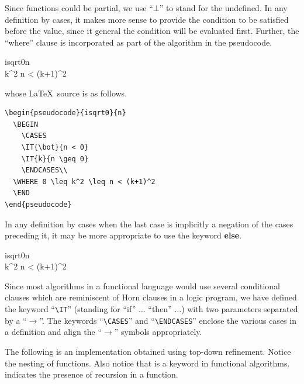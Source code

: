 \documentclass[a4]{article}
\begin{document}
Since functions could be partial, we use ``$\bot$'' to stand for the undefined.
In any definition by
cases, it makes more sense to provide the condition to be satisfied before the
value, since it general the condition will be evaluated first. Further, the
``where'' clause is incorporated as part of the algorithm in the pseudocode.

\begin{pseudocode}{isqrt0}{n}
  \BEGIN
    \CASES
    \ENDCASES\\
   \leq k^2 \leq n < (k+1)^2      
  \END
\end{pseudocode}

\noindent{}whose  \LaTeX\ source is as follows.

\begin{verbatim}
\begin{pseudocode}{isqrt0}{n}
  \BEGIN
    \CASES
    \IT{\bot}{n < 0}
    \IT{k}{n \geq 0}
    \ENDCASES\\
  \WHERE 0 \leq k^2 \leq n < (k+1)^2      
  \END
\end{pseudocode}  
\end{verbatim}

In any definition by cases when the last case is implicitly a negation of the
cases preceding it, it may be more appropriate to use the keyword {\bf else}.


\begin{pseudocode}{isqrt0}{n}
  \BEGIN
    \CASES
    \ENDCASES\\
   \leq k^2 \leq n < (k+1)^2      
  \END
\end{pseudocode}


Since most algorithms in a functional language would use several
conditional clauses which are reminiscent of Horn clauses in a logic
program, we have defined the keyword ``{\tt \textbackslash IT}''
(standing for ``if'' $\ldots$ ``then'' $\ldots$)
with two parameters separated by a ``$\rightarrow$''. The keywords
``{\tt \textbackslash CASES}'' and ``{\tt \textbackslash ENDCASES}''
enclose the various cases in a definition and align the
``$\rightarrow$'' symbols appropriately.

The following is an implementation obtained using top-down
refinement.  Notice the nesting of functions. Also notice that
\REC is a keyword in functional algorithms. \REC  indicates the presence of recursion in a function.
\end{document}
